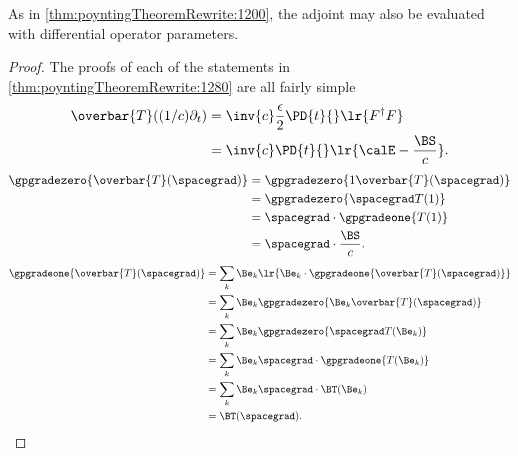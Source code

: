 As in \cref{thm:poyntingTheoremRewrite:1200},
the adjoint may also be evaluated with differential operator parameters.
\begin{proof}
The proofs of each of the statements in \cref{thm:poyntingTheoremRewrite:1280} are all fairly simple
\begin{equation}\label{eqn:poyntingTheoremRewrite:1280}
\begin{aligned}
\overbar{T}((1/c)\partial_t)
&= \inv{c} \frac{\epsilon}{2} \PD{t}{} \lr{ F^\dagger F } \\
&= \inv{c} \PD{t}{} \lr{ \calE - \frac{\BS}{c} }.
\end{aligned}
\end{equation}
\begin{equation}\label{eqn:poyntingTheoremRewrite:1300}
\begin{aligned}
\gpgradezero{ \overbar{T}(\spacegrad) }
&= \gpgradezero{ 1 \overbar{T}(\spacegrad) } \\
&= \gpgradezero{ \spacegrad T(1) } \\
&= \spacegrad \cdot \gpgradeone{ T(1) } \\
&= \spacegrad \cdot \frac{\BS}{c}.
\end{aligned}
\end{equation}
\begin{equation}\label{eqn:poyntingTheoremRewrite:1320}
\begin{aligned}
\gpgradeone{ \overbar{T}(\spacegrad) }
&= \sum_k \Be_k \lr{ \Be_k \cdot \gpgradeone{ \overbar{T}(\spacegrad) } } \\
&= \sum_k \Be_k \gpgradezero{ \Be_k \overbar{T}(\spacegrad) } \\
&= \sum_k \Be_k \gpgradezero{ \spacegrad T(\Be_k) } \\
&= \sum_k \Be_k \spacegrad \cdot \gpgradeone{ T(\Be_k) } \\
&= \sum_k \Be_k \spacegrad \cdot \BT(\Be_k) \\
&= \BT(\spacegrad).
\end{aligned}
\end{equation}
\end{proof}
